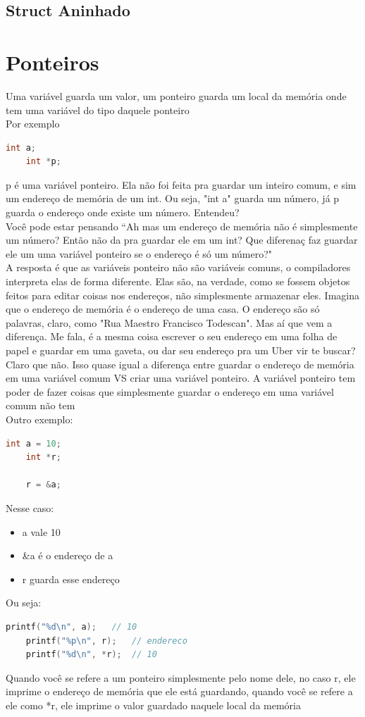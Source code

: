 \documentclass{article}
\begin{document}
\subsection{Struct Aninhado}

\section{Ponteiros}
Uma variável guarda um valor, um ponteiro guarda um local da memória onde tem uma variável do tipo daquele ponteiro
\\[5pt]
Por exemplo
\begin{lstlisting}[language=C]
    int a;
    int *p;
\end{lstlisting}
p é uma variável ponteiro. Ela não foi feita pra guardar um inteiro comum, e sim um endereço de memória de um int. Ou seja, "int a" guarda um número, já p guarda o endereço onde existe um número. Entendeu? 
\\[3pt]
Você pode estar pensando ``Ah mas um endereço de memória não é simplesmente um número? Então não da pra guardar ele em um int? Que diferenaç faz guardar ele um uma variável ponteiro se o endereço é só um número?"
\\[3pt]
A resposta é que as variáveis ponteiro não são variáveis comuns, o compiladores interpreta elas de forma diferente. Elas são, na verdade, como se fossem objetos feitos para editar coisas nos endereços, não simplesmente armazenar eles. Imagina que o endereço de memória é o endereço de uma casa. O endereço são só palavras, claro, como "Rua Maestro Francisco Todescan". Mas aí que vem a diferença. Me fala, é a mesma coisa escrever o seu endereço em uma folha de papel e guardar em uma gaveta, ou dar seu endereço pra um Uber vir te buscar? Claro que não. Isso quase igual a diferença entre guardar o endereço de memória em uma variável comum VS criar uma variável ponteiro. A variável ponteiro tem poder de fazer coisas que simplesmente guardar o endereço em uma variável comum não tem 
\\[5pt]
Outro exemplo:
\begin{lstlisting}[language=C]
    int a = 10;
    int *r;

    r = &a;
\end{lstlisting}
Nesse caso:
\begin{itemize}
    \item a vale 10
    \item \&a é o endereço de a
    \item r guarda esse endereço
\end{itemize}
Ou seja:
\begin{lstlisting}[language=C]
    printf("%d\n", a);   // 10
    printf("%p\n", r);   // endereco
    printf("%d\n", *r);  // 10
\end{lstlisting}
Quando você se refere a um ponteiro simplesmente pelo nome dele, no caso r, ele imprime o endereço de memória que ele está guardando, quando você se refere a ele como *r, ele imprime o valor guardado naquele local da memória
\end{document}
